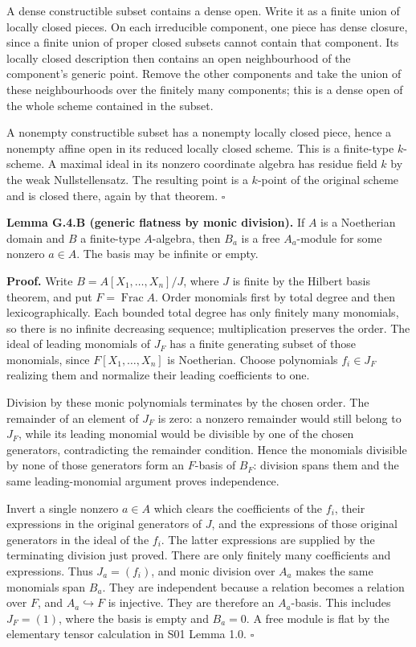 \documentclass[11pt,a4paper,openany]{report}
\newcounter{none}
\begin{document}
A dense constructible subset contains a dense open. Write it as a finite union of locally closed pieces. On each irreducible component, one piece has dense closure, since a finite union of proper closed subsets cannot contain that component. Its locally closed description then contains an open neighbourhood of the component's generic point. Remove the other components and take the union of these neighbourhoods over the finitely many components; this is a dense open of the whole scheme contained in the subset.

A nonempty constructible subset has a nonempty locally closed piece, hence a nonempty affine open in its reduced locally closed scheme. This is a finite-type \(k\)-scheme. A maximal ideal in its nonzero coordinate algebra has residue field \(k\) by the weak Nullstellensatz. The resulting point is a \(k\)-point of the original scheme and is closed there, again by that theorem. \(\square\)

\textbf{Lemma G.4.B (generic flatness by monic division).} If \(A\) is a Noetherian domain and \(B\) a finite-type \(A\)-algebra, then \(B_a\) is a free \(A_a\)-module for some nonzero \(a\in A\). The basis may be infinite or empty.

\textbf{Proof.} Write \(B=A[X_1,\ldots,X_n]/J\), where \(J\) is finite by the Hilbert basis theorem, and put \(F=\operatorname{Frac}A\). Order monomials first by total degree and then lexicographically. Each bounded total degree has only finitely many monomials, so there is no infinite decreasing sequence; multiplication preserves the order. The ideal of leading monomials of \(J_F\) has a finite generating subset of those monomials, since \(F[X_1,\ldots,X_n]\) is Noetherian. Choose polynomials \(f_i\in J_F\) realizing them and normalize their leading coefficients to one.

Division by these monic polynomials terminates by the chosen order. The remainder of an element of \(J_F\) is zero: a nonzero remainder would still belong to \(J_F\), while its leading monomial would be divisible by one of the chosen generators, contradicting the remainder condition. Hence the monomials divisible by none of those generators form an \(F\)-basis of \(B_F\): division spans them and the same leading-monomial argument proves independence.

Invert a single nonzero \(a\in A\) which clears the coefficients of the \(f_i\), their expressions in the original generators of \(J\), and the expressions of those original generators in the ideal of the \(f_i\). The latter expressions are supplied by the terminating division just proved. There are only finitely many coefficients and expressions. Thus \(J_a=(f_i)\), and monic division over \(A_a\) makes the same monomials span \(B_a\). They are independent because a relation becomes a relation over \(F\), and \(A_a\hookrightarrow F\) is injective. They are therefore an \(A_a\)-basis. This includes \(J_F=(1)\), where the basis is empty and \(B_a=0\). A free module is flat by the elementary tensor calculation in S01 Lemma 1.0. \(\square\)
\end{document}
